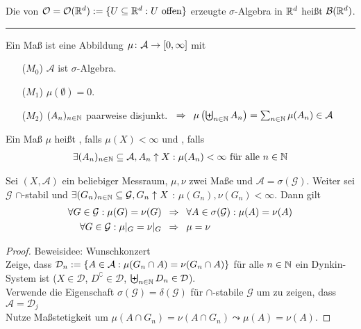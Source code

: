 \documentclass[a4paper, 11pt, ngerman]{scrartcl}
\begin{document}
\begin{defin}
	Die von $\mathcal{O} = \mathcal{O}(\mathbb{R}^d) := \{ U \subseteq \mathbb{R}^d : U \text{ offen} \}$ erzeugte $\sigma$-Algebra in $\mathbb{R}^d$ heißt  $\mathcal{B}(\mathbb{R}^d)$.
\end{defin}

\noindent\rule{4cm}{0.4pt}

\begin{defin}
	Ein Maß ist eine Abbildung $\mu \colon \mathcal{A} \to [0,\infty]$ mit
	\begin{itemize}[noitemsep]
		\item[($M_0$)] $\mathcal{A}$ ist $\sigma$-Algebra.
		\item[($M_1$)] $\mu(\emptyset) = 0$.
		\item[($M_2$)] $(A_n)_{n \in \mathbb{N}}$ paarweise disjunkt. $\enspace \Rightarrow \enspace \mu\left( \biguplus_{n \in \mathbb{N}}{A_n} \right) = \sum_{n \in \mathbb{N}}{\mu(A_n)} \in \mathcal{A}$
	\end{itemize}
	Ein Maß $\mu$ heißt , falls $\mu(X) < \infty$ und , falls
	\begin{align*}
	\exists (A_n)_{n \in \mathbb{N}} \subseteq \mathcal{A}, A_n \uparrow X : \mu(A_n) < \infty \text{ für alle } n \in \mathbb{N}
	\end{align*}
\end{defin}

\begin{thm}[Eindeutigkeitssatz]
	Sei $(X,\mathcal{A})$ ein beliebiger Messraum, $\mu, \nu$ zwei Maße und $\mathcal{A} = \sigma(\mathcal{G})$. Weiter sei $\mathcal{G}$ $\cap$-stabil und $\exists (G_n)_{n \in \mathbb{N}} \subseteq \mathcal{G}, G_n \uparrow X$ : $\mu(G_n), \nu(G_n) < \infty$. Dann gilt
	\begin{align*}
	\forall G \in \mathcal{G}: \mu(G) = \nu(G) &\enspace \Rightarrow \enspace \forall A \in \sigma(\mathcal{G}) : \mu(A) = \nu(A) \\
	\forall G \in \mathcal{G} : \mu |_G = \nu |_G &\enspace \Rightarrow \enspace \mu = \nu
	\end{align*}
\end{thm}
\begin{proof}
	Beweisidee: Wunschkonzert \\
	Zeige, dass $\mathcal{D}_n := \{ A \in \mathcal{A} : \mu(G_n \cap A) = \nu(G_n \cap A) \}$ für alle $n \in \mathbb{N}$ ein Dynkin-System ist ($X \in \mathcal{D}$, $D^\complement \in \mathcal{D}$, $\biguplus_{n \in \mathbb{N}}{D_n} \in \mathcal{D}$). \\
	Verwende die Eigenschaft $\sigma(\mathcal{G}) = \delta(\mathcal{G})$ für $\cap$-stabile $\mathcal{G}$ um zu zeigen, dass $\mathcal{A} = \mathcal{D}_j$ \\
	Nutze Maßstetigkeit um $\mu(A \cap G_n) = \nu(A \cap G_n) \leadsto \mu(A) = \nu(A)$.
\end{proof}
\end{document}
